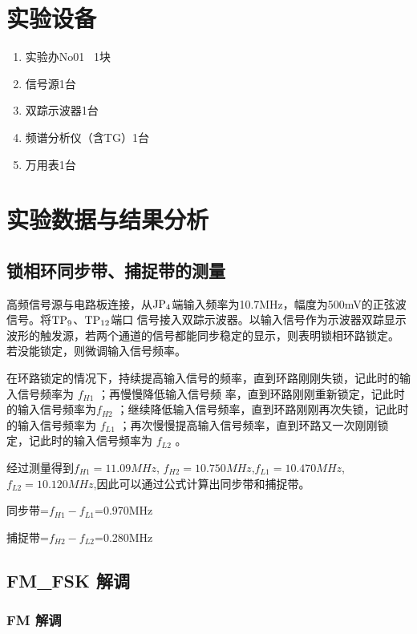 \documentclass{../source/Experiment}
\begin{document}
    \section{实验设备}
        \begin{enumerate}
            \item 实验办No01 \, 1块
            \item 信号源1台
            \item 双踪示波器1台
            \item 频谱分析仪（含TG）1台
            \item 万用表1台
        \end{enumerate}
        
    \section{实验数据与结果分析}
        \subsection{锁相环同步带、捕捉带的测量}

        高频信号源与电路板连接，从$\rm JP_4$端输入频率为10.7MHz，幅度为500mV的正弦波信号。将$\rm TP_9$、$\rm TP_{12}$端口
        信号接入双踪示波器。以输入信号作为示波器双踪显示波形的触发源，若两个通道的信号都能同步稳定的显示，则表明锁相环路锁定。
        若没能锁定，则微调输入信号频率。 

        在环路锁定的情况下，持续提高输入信号的频率，直到环路刚刚失锁，记此时的输入信号频率为 $f_{H1}$ ；再慢慢降低输入信号频
        率，直到环路刚刚重新锁定，记此时的输入信号频率为$f_{H2}$ ；继续降低输入信号频率，直到环路刚刚再次失锁，记此时的输入信号频率为 $f_{L1}$ ；再次慢慢提高输入信号频率，直到环路又一次刚刚锁定，记此时的输入信号频率为 $f_{L2}$ 。 


        经过测量得到$ f_{H1}=11.09MHz $,
        $ f_{H2}=10.750MHz $,$ f_{L1}=10.470MHz $,$ f_{L2}=10.120MHz $,因此可以通过公式计算出同步带和捕捉带。

        同步带=$f_{H1}-f_{L1}$=0.970MHz

        捕捉带=$f_{H2}-f_{L2}$=0.280MHz

        \subsection{FM\_FSK 解调 }
            \subsubsection{FM 解调}
            
\end{document}
